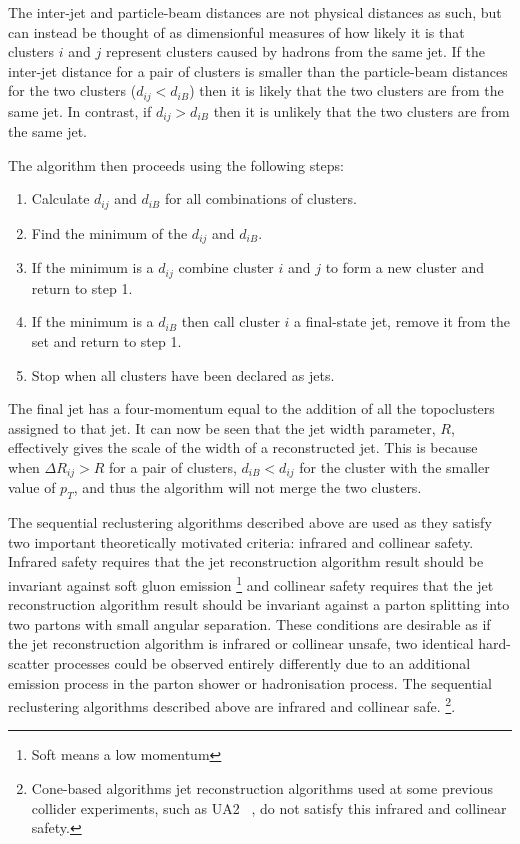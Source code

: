 The inter-jet and particle-beam distances are not physical distances as such, but can instead be thought of as dimensionful measures of how likely it is that
clusters $i$ and $j$ represent clusters caused by hadrons from the same jet.
If the inter-jet distance for a pair of clusters is smaller than the particle-beam distances for the two clusters ($d_{ij} < d_{iB}$) 
then it is likely that the two clusters are from the same jet. 
In contrast, if $d_{ij} > d_{iB}$ then it is unlikely that the two clusters are from the same jet.
 
\noindent The algorithm then proceeds using the following steps:
\vspace{-1em}
\begin{enumerate}[nolistsep]
  \item Calculate $d_{ij}$ and $d_{iB}$ for all combinations of clusters.  
  \item Find the minimum of the $d_{ij}$ and $d_{iB}$. 
  \item If the minimum is a $d_{ij}$ combine cluster $i$ and $j$ to form a new cluster and return to step 1. 
  \item If the minimum is a $d_{iB}$ then call cluster $i$ a final-state jet, remove it from the set and return to step 1.  
  \item Stop when all clusters have been declared as jets. 
\end{enumerate} 
The final jet has a four-momentum equal to the addition of all the topoclusters assigned to that jet.
It can now be seen that the jet width parameter, $R$, effectively gives the scale of the width of a reconstructed jet.
This is because when $\Delta R_{ij} > R$ for a pair of clusters,
$d_{iB} < d_{ij}$ for the cluster with the smaller value of ${p_T}$,
and thus the algorithm will not merge the two clusters.

The sequential reclustering algorithms described above are used as they satisfy two important theoretically motivated criteria:
infrared and collinear safety.
Infrared safety requires that the jet reconstruction algorithm result should be invariant against soft gluon emission \footnote{Soft means a low momentum}
and collinear safety requires that the jet reconstruction algorithm result should be invariant against a parton splitting into two partons with small angular separation.
These conditions are desirable as if the jet reconstruction algorithm is infrared or collinear unsafe,
two identical hard-scatter processes could be observed entirely differently due to an additional emission process in the parton shower or hadronisation process.
The sequential reclustering algorithms described above are infrared and collinear safe.
\footnote{Cone-based algorithms jet reconstruction algorithms used at some previous collider experiments,
  such as UA2 ~\cite{obj-jets_reco_UA2}, do not satisfy this infrared and collinear safety.}.

